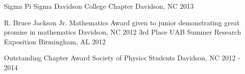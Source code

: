 \begin{cvhonors}
  \cvhonor
    {Sigma Pi Sigma} %
    {Davidson College Chapter} %
    {Davidson, NC} %
    {2013} %

  \cvhonor
    {R. Bruce Jackson Jr. Mathematics Award} %
    {given to junior demonstrating great promise in mathematics} %
    {Davidson, NC} %
    {2012} %
%
  \cvhonor
    {3rd Place} %
    {UAB Summer Research Exposition} %
    {Birmingham, AL} %
    {2012} %

  \cvhonor
    {Outstanding Chapter Award} %
    {Society of Physics Students} %
    {Davidson, NC} %
    {2012 - 2014} %

\end{cvhonors}




%
%
%
%
%
%
%
%
